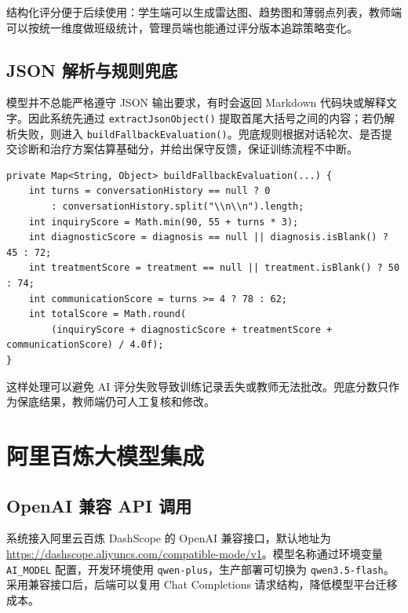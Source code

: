 结构化评分便于后续使用：学生端可以生成雷达图、趋势图和薄弱点列表，教师端可以按统一维度做班级统计，管理员端也能通过评分版本追踪策略变化。

\subsection{JSON 解析与规则兜底}

模型并不总能严格遵守 JSON 输出要求，有时会返回 Markdown 代码块或解释文字。因此系统先通过 \texttt{extractJsonObject()} 提取首尾大括号之间的内容；若仍解析失败，则进入 \texttt{buildFallbackEvaluation()}。兜底规则根据对话轮次、是否提交诊断和治疗方案估算基础分，并给出保守反馈，保证训练流程不中断。

\begin{lstlisting}[style=java, caption={评分 JSON 解析兜底逻辑（节选）}, label={lst:fallback}]
private Map<String, Object> buildFallbackEvaluation(...) {
    int turns = conversationHistory == null ? 0
        : conversationHistory.split("\\n\\n").length;
    int inquiryScore = Math.min(90, 55 + turns * 3);
    int diagnosticScore = diagnosis == null || diagnosis.isBlank() ? 45 : 72;
    int treatmentScore = treatment == null || treatment.isBlank() ? 50 : 74;
    int communicationScore = turns >= 4 ? 78 : 62;
    int totalScore = Math.round(
        (inquiryScore + diagnosticScore + treatmentScore + communicationScore) / 4.0f);
}
\end{lstlisting}

这样处理可以避免 AI 评分失败导致训练记录丢失或教师无法批改。兜底分数只作为保底结果，教师端仍可人工复核和修改。

\section{阿里百炼大模型集成}

\subsection{OpenAI 兼容 API 调用}

系统接入阿里云百炼 DashScope 的 OpenAI 兼容接口\cite{dashscope2024}，默认地址为 \url{https://dashscope.aliyuncs.com/compatible-mode/v1}。模型名称通过环境变量 \texttt{AI\_MODEL} 配置，开发环境使用 \texttt{qwen-plus}，生产部署可切换为 \texttt{qwen3.5-flash}。采用兼容接口后，后端可以复用 Chat Completions 请求结构，降低模型平台迁移成本。

